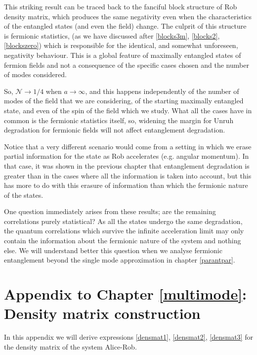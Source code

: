 This striking result can be traced back to the fanciful block structure of Rob density matrix, which produces the same negativity even when the characteristics of the entangled states (and even the field) change. The culprit of this structure is fermionic statistics, (as we have discussed after \eqref{blocks3m}, \eqref{blocks2}, \eqref{blockszero}) which is responsible for the identical, and somewhat unforeseen, negativity behaviour. This is a global feature of maximally entangled states of fermion fields and not a consequence of the specific cases chosen and the number of modes considered. 

So, $\mathcal{N}\rightarrow 
1/4$ when $a\rightarrow\infty$, and this happens independently of the number of modes of the field that we are considering, of the starting maximally entangled state, and even of the spin of the field which we study. What all the cases have in common is the fermionic statistics itself, so, widening the margin for Unruh degradation for fermionic fields will not affect entanglement degradation.

Notice that a very different scenario would come from a setting in which we erase partial information for the state as Rob accelerates (e.g. angular momentum). In that case, it was shown in the previous chapter that entanglement degradation is greater than in the cases where all the information is taken into account, but this has more to do with this erasure of information than which the fermionic nature of the states.

One question immediately arises from these results; are the remaining correlations purely statistical? As all the states undergo the same degradation,  the quantum correlations which survive the infinite acceleration limit may only contain the information about the fermionic nature of the system and nothing else. We will understand better this question when we analyse fermionic entanglement beyond the single mode approximation in chapter \ref{parantpar}. 


\section[Appendix to the Chapter: Density matrix construction]{Appendix to Chapter \ref{multimode}: Density matrix construction}\label{ap2}

In this appendix we will derive expressions \eqref{densmat1}, \eqref{densmat2}, \eqref{densmat3} for the density matrix of the system Alice-Rob.

